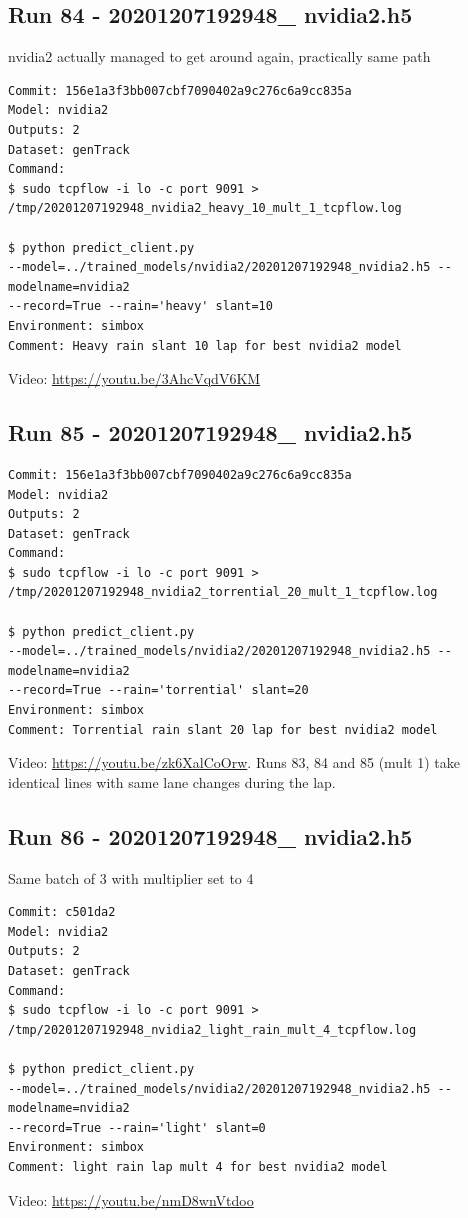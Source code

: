 \subsection{Run 84 - 20201207192948\_ nvidia2.h5 }
nvidia2 actually managed to get around again, practically same path
\label{app_res:84}
\begin{verbatim}
Commit: 156e1a3f3bb007cbf7090402a9c276c6a9cc835a
Model: nvidia2 
Outputs: 2
Dataset: genTrack
Command:
$ sudo tcpflow -i lo -c port 9091 > 
/tmp/20201207192948_nvidia2_heavy_10_mult_1_tcpflow.log

$ python predict_client.py
--model=../trained_models/nvidia2/20201207192948_nvidia2.h5 --modelname=nvidia2 
--record=True --rain='heavy' slant=10
Environment: simbox
Comment: Heavy rain slant 10 lap for best nvidia2 model
\end{verbatim}
Video: \url{https://youtu.be/3AhcVqdV6KM}

\subsection{Run 85 - 20201207192948\_ nvidia2.h5 }

\label{app_res:85}
\begin{verbatim}
Commit: 156e1a3f3bb007cbf7090402a9c276c6a9cc835a
Model: nvidia2 
Outputs: 2
Dataset: genTrack
Command:
$ sudo tcpflow -i lo -c port 9091 > 
/tmp/20201207192948_nvidia2_torrential_20_mult_1_tcpflow.log

$ python predict_client.py
--model=../trained_models/nvidia2/20201207192948_nvidia2.h5 --modelname=nvidia2 
--record=True --rain='torrential' slant=20
Environment: simbox
Comment: Torrential rain slant 20 lap for best nvidia2 model
\end{verbatim}
Video: \url{https://youtu.be/zk6XalCoOrw}. Runs 83, 84 and 85 (mult 1) take identical lines with same lane changes during the lap.

\subsection{Run 86 - 20201207192948\_ nvidia2.h5 }
Same batch of 3 with multiplier set to 4
\label{app_res:86}
\begin{verbatim}
Commit: c501da2
Model: nvidia2 
Outputs: 2
Dataset: genTrack
Command:
$ sudo tcpflow -i lo -c port 9091 > 
/tmp/20201207192948_nvidia2_light_rain_mult_4_tcpflow.log

$ python predict_client.py
--model=../trained_models/nvidia2/20201207192948_nvidia2.h5 --modelname=nvidia2 
--record=True --rain='light' slant=0
Environment: simbox
Comment: light rain lap mult 4 for best nvidia2 model
\end{verbatim}
Video: \url{https://youtu.be/nmD8wnVtdoo}


